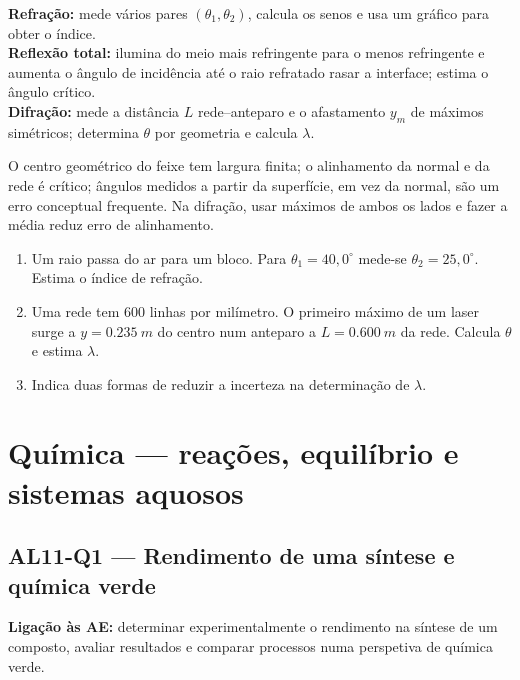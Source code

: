 \documentclass[11pt,a4paper,openany]{book}
\newcounter{exercicio}[chapter]
\renewcommand{\theexercicio}{\thechapter.\arabic{exercicio}}
\newenvironment{exercicio}[1][]%
{\refstepcounter{exercicio}%
\begin{tcolorbox}[breakable,colback=white,colframe=eublue!70,
 title={Exercício \theexercicio\if\relax\detokenize{#1}\relax\else\ --- #1\fi},fonttitle=\bfseries]}%
{\end{tcolorbox}}
\newcommand{\LigAE}[1]{\textbf{Ligação às AE:} #1}
\begin{document}
\begin{metodo}
\textbf{Refração:} mede vários pares $(\theta_1,\theta_2)$, calcula os senos e usa um gráfico para obter o índice.\\
\textbf{Reflexão total:} ilumina do meio mais refringente para o menos refringente e aumenta o ângulo de incidência até o raio refratado rasar a interface; estima o ângulo crítico.\\
\textbf{Difração:} mede a distância $L$ rede--anteparo e o afastamento $y_m$ de máximos simétricos; determina $\theta$ por geometria e calcula $\lambda$.
\end{metodo}

\begin{erros}
O centro geométrico do feixe tem largura finita; o alinhamento da normal e da rede é crítico; ângulos medidos a partir da superfície, em vez da normal, são um erro conceptual frequente. Na difração, usar máximos de ambos os lados e fazer a média reduz erro de alinhamento.
\end{erros}

\begin{exercicio}[Índice e comprimento de onda]
\begin{enumerate}[label=\alph*)]
\item Um raio passa do ar para um bloco. Para $\theta_1=40,0^\circ$ mede-se $\theta_2=25,0^\circ$. Estima o índice de refração.
\item Uma rede tem $600$ linhas por milímetro. O primeiro máximo de um laser surge a $y=\SI{0.235}{m}$ do centro num anteparo a $L=\SI{0.600}{m}$ da rede. Calcula $\theta$ e estima $\lambda$.
\item Indica duas formas de reduzir a incerteza na determinação de $\lambda$.
\end{enumerate}
\end{exercicio}

\chapter{Química — reações, equilíbrio e sistemas aquosos}

\section{AL11-Q1 — Rendimento de uma síntese e química verde}
\LigAE{determinar experimentalmente o rendimento na síntese de um composto, avaliar resultados e comparar processos numa perspetiva de química verde.}
\end{document}
